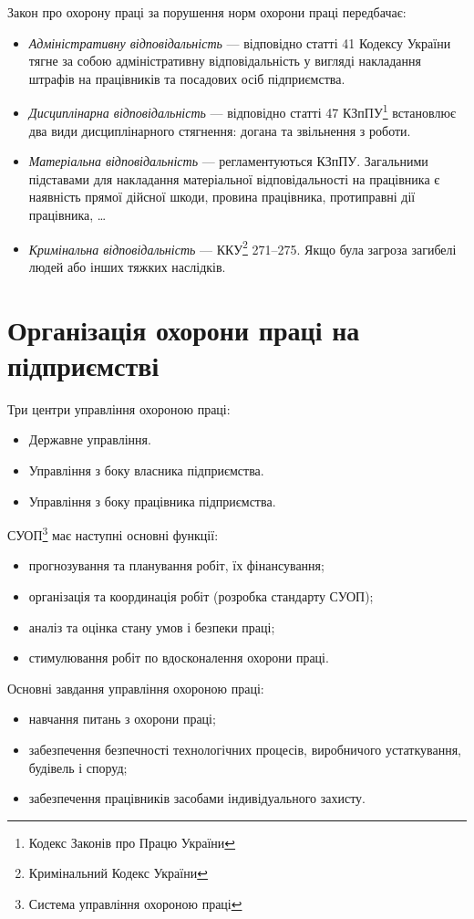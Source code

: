 \documentclass[a4paper,10pt,notitlepage,pdftex,headsepline]{scrartcl}
\begin{document}
  Закон про охорону праці за порушення норм охорони праці передбачає:
  \begin{itemize}
    \item \emph{Адміністративну відповідальність} --- відповідно статті 41
      Кодексу України тягне за собою адміністративну відповідальність у
      вигляді накладання штрафів на працівників та посадових осіб
      підприємства.
    \item \emph{Дисциплінарна відповідальність} --- відповідно статті 47
      КЗпПУ\footnote{Кодекс Законів про Працю України} встановлює два види
      дисциплінарного стягнення: догана та звільнення з роботи.
    \item \emph{Матеріальна відповідальність} --- регламентуються КЗпПУ.
      Загальними підставами для накладання матеріальної відповідальності на
      працівника є наявність прямої дійсної шкоди, провина працівника,
      протиправні дії працівника, \ldots
    \item \emph{Кримінальна відповідальність} --- ККУ\footnote{Кримінальний
      Кодекс України} 271--275.
      Якщо була загроза загибелі людей або інших тяжких наслідків.
  \end{itemize}

\section{Організація охорони праці на підприємстві}
  Три центри управління охороною праці:
  \begin{itemize}
    \item Державне управління.
    \item Управління з боку власника підприємства.
    \item Управління з боку працівника підприємства.
  \end{itemize}

  СУОП\footnote{Система управління охороною праці} має наступні основні
  функції:
  \begin{itemize}
    \item прогнозування та планування робіт, їх фінансування;
    \item організація та координація робіт (розробка стандарту СУОП);
    \item аналіз та оцінка стану умов і безпеки праці;
    \item стимулювання робіт по вдосконалення охорони праці.
  \end{itemize}

  Основні завдання управління охороною праці:
  \begin{itemize}
    \item навчання питань з охорони праці;
    \item забезпечення безпечності технологічних процесів, виробничого
      устаткування, будівель і споруд;
    \item забезпечення працівників засобами індивідуального захисту.
  \end{itemize}
\end{document}
